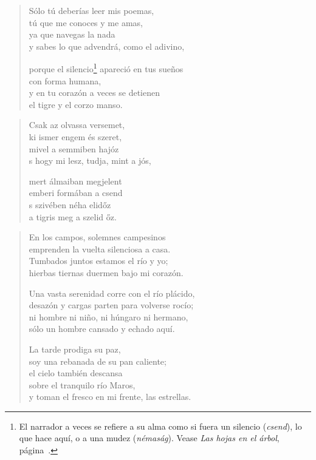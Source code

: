 \documentclass[11pt]{book}
\newcommand*{\centeredornament}{\centerline{\pgfornament[width=6cm]{88}}}
\begin{document}
\begin{verse}
  Sólo tú deberías leer mis poemas, \\
  tú que me conoces y me amas, \\
  ya que navegas la nada \\
  y sabes lo que advendrá, como el adivino,

  porque el silencio\footnote{El narrador a veces se refiere a su alma
  como si fuera un silencio (\emph{csend}), lo que hace aquí, o a una
  mudez (\emph{némaság}). Vease \emph{Las hojas en el árbol}, página~\pageref{las_hojas_en_el_arbol}.} apareció en tus sueños \\
  con forma humana, \\
  y en tu corazón a veces se detienen \\
  el tigre y el corzo manso.
\end{verse}

\newpage

\vspace*{-15mm}
\centeredornament



\begin{verse}
  Csak az olvassa versemet, \\
  ki ismer engem és szeret, \\
  mivel a semmiben hajóz \\
  s hogy mi lesz, tudja, mint a jós,

  mert álmaiban megjelent \\
  emberi formában a csend \\
  s szivében néha elidőz \\
  a tigris meg a szelid őz.
\end{verse}

\newpage

\vspace*{-15mm}
\centeredornament



\begin{verse}
  En los campos, solemnes campesinos \\
  emprenden la vuelta silenciosa a casa. \\
  Tumbados juntos estamos el río y yo; \\
  hierbas tiernas duermen bajo mi corazón.

  Una vasta serenidad corre con el río plácido, \\
  desazón y cargas parten para volverse rocío; \\
  ni hombre ni niño, ni húngaro ni hermano, \\
  sólo un hombre cansado y echado aquí.

  La tarde prodiga su paz, \\
  soy una rebanada de su pan caliente; \\
  el cielo también descansa \\
  sobre el tranquilo río Maros, \\
  y toman el fresco en mi frente, las estrellas.
\end{verse}
\end{document}

